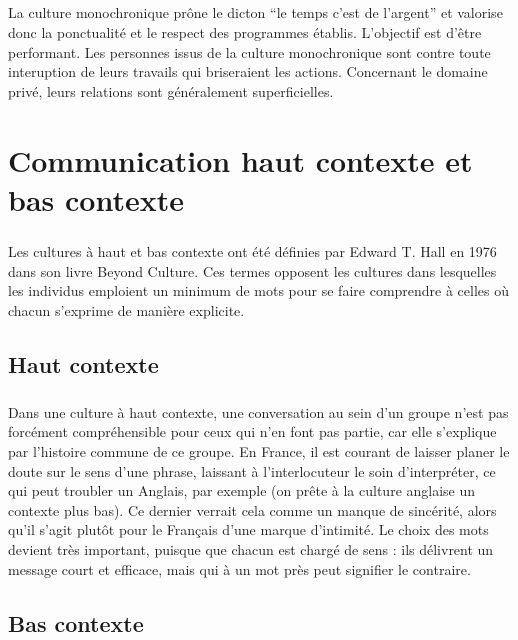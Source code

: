 \paragraph{} La culture monochronique prône le dicton ``le temps c'est de
l'argent'' et valorise donc la ponctualité et le respect des programmes
établis. L'objectif est d'être performant. Les personnes issus de la culture
monochronique sont contre toute interuption de leurs travails qui briseraient
les actions. Concernant le domaine privé, leurs relations sont généralement
superficielles.

\chapter[Haut contexte, bas contexte]{Communication haut contexte et bas contexte}

\paragraph{} Les cultures à haut et bas contexte ont été définies par Edward T.
Hall en 1976 dans son livre Beyond Culture. Ces termes opposent les cultures
dans lesquelles les individus emploient un minimum de mots pour se faire
comprendre à celles où chacun s’exprime de manière explicite.

\section{Haut contexte}

\paragraph{} Dans une culture à haut contexte, une conversation au sein d’un
groupe n’est pas forcément compréhensible pour ceux qui n’en font pas partie,
car elle s’explique par l’histoire commune de ce groupe. En France, il est
courant de laisser planer le doute sur le sens d’une phrase, laissant à
l’interlocuteur le soin d’interpréter, ce qui peut troubler un Anglais, par
exemple (on prête à la culture anglaise un contexte plus bas). Ce dernier
verrait cela comme un manque de sincérité, alors qu’il s’agit plutôt pour le
Français d’une marque d’intimité. Le choix des mots devient très important,
puisque que chacun est chargé de sens : ils délivrent un message court et
efficace, mais qui à un mot près peut signifier le contraire.

\section{Bas contexte}

